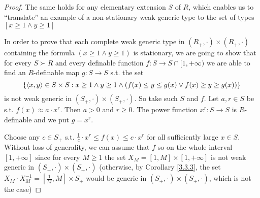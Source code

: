 \documentclass[11pt]{article}
\begin{document}
\begin{proof}
The same holds for any elementary extension \(S\) of \(R\), which enables us to ``translate'' an
example of a non-stationary weak generic type to the set of types \([x\ge 1\wedge y\ge 1]\)

In order to prove that each complete weak generic type in \((R_+,\cdot)\times(R_+,\cdot)\) containing the
formula \((x\ge 1\wedge y\ge 1)\) is stationary, we are going to show that for every \(S\succ R\) and every
definable function \(f:S\to S\cap[1,+\infty)\) we are able to find an \(R\)-definable map \(g:S\to S\) s.t.
the set
\begin{equation*}
\{\langle x,y\rangle\in S\times S:x\ge 1\wedge y\ge 1\wedge(f(x)\le y\le g(x)\vee f(x)\ge y\ge g(x))\}
\end{equation*}
is not weak generic in \((S_+,\cdot)\times(S_+,\cdot)\). So take such \(S\) and \(f\). Let \(a,r\in S\) be
s.t. \(f(x)\approx a\cdot x^r\). Then \(a>0\) and \(r\ge 0\). The power function \(x^r:S\to S\)
is \(R\)-definable and we put \(g=x^r\).

Choose any \(c\in S_+\) s.t. \(\frac{1}{c}\cdot x^r\le f(x)\le c\cdot x^r\) for all sufficiently large \(x\in S\).
Without loss of generality, we can assume that \(f\) so on the whole interval \([1,+\infty]\) since
for every \(M\ge 1\) the set \(X_M=[1,M]\times[1,+\infty]\) is not weak generic in \((S_+,\cdot)\times(S_+,\cdot)\)
(otherwise, by Corollary \ref{3.3.3}, the set \(X_M\cdot X^{-1}_M=[\frac{1}{M},M]\times S_+\) would be
generic in \((S_+,\cdot)\times(S_+,\cdot)\), which is not the case)


\end{proof}
\end{document}
